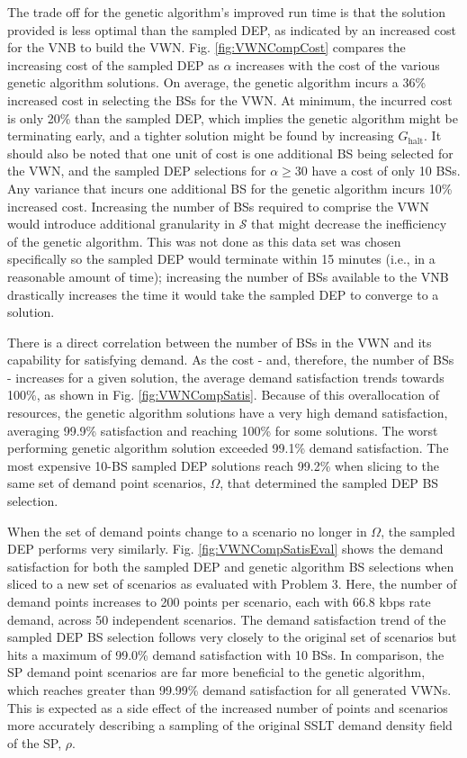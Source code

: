 \documentclass[12pt,dvipsnames]{report}
\begin{document}
The trade off for the genetic algorithm's improved run time is that the solution provided is less optimal than the sampled DEP, as indicated by an increased cost for the VNB to build the VWN.  Fig. \ref{fig:VWNCompCost} compares the increasing cost of the sampled DEP as $\alpha$ increases with the cost of the various genetic algorithm solutions.  On average, the genetic algorithm incurs a 36\% increased cost in selecting the BSs for the VWN.  At minimum, the incurred cost is only 20\% than the sampled DEP, which implies the genetic algorithm might be terminating early, and a tighter solution might be found by increasing $G_\text{halt}$.  It should also be noted that one unit of cost is one additional BS being selected for the VWN, and the sampled DEP selections for $\alpha \geq 30$ have a cost of only 10 BSs.  Any variance that incurs one additional BS for the genetic algorithm incurs 10\% increased cost.  Increasing the number of BSs required to comprise the VWN would introduce additional granularity in $\mathcal{S}$ that might decrease the inefficiency of the genetic algorithm.  This was not done as this data set was chosen specifically so the sampled DEP would terminate within 15 minutes (i.e., in a reasonable amount of time); increasing the number of BSs available to the VNB drastically increases the time it would take the sampled DEP to converge to a solution.

There is a direct correlation between the number of BSs in the VWN and its capability for satisfying demand.  As the cost - and, therefore, the number of BSs - increases for a given solution, the average demand satisfaction trends towards 100\%, as shown in Fig. \ref{fig:VWNCompSatis}.  Because of this overallocation of resources, the genetic algorithm solutions have a very high demand satisfaction, averaging 99.9\% satisfaction and reaching 100\% for some solutions.  The worst performing genetic algorithm solution exceeded 99.1\% demand satisfaction.  The most expensive 10-BS sampled DEP solutions reach 99.2\% when slicing to the same set of demand point scenarios, $\Omega$, that determined the sampled DEP BS selection.

When the set of demand points change to a scenario no longer in $\Omega$, the sampled DEP performs very similarly.  Fig. \ref{fig:VWNCompSatisEval} shows the demand satisfaction for both the sampled DEP and genetic algorithm BS selections when sliced to a new set of scenarios as evaluated with Problem 3.  Here, the number of demand points increases to 200 points per scenario, each with 66.8 kbps rate demand, across 50 independent scenarios.  The demand satisfaction trend of the sampled DEP BS selection follows very closely to the original set of scenarios but hits a maximum of 99.0\% demand satisfaction with 10 BSs.  In comparison, the SP demand point scenarios are far more beneficial to the genetic algorithm, which reaches greater than 99.99\% demand satisfaction for all generated VWNs.  This is expected as a side effect of the increased number of points and scenarios more accurately describing a sampling of the original SSLT demand density field of the SP, $\rho$.
\end{document}
